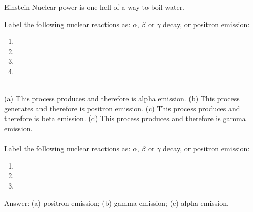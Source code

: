 \documentclass[main.tex]{subfiles}
\begin{document}
\begin{description}
\begin{marginfigure}%
    \begin{shadequote}[l]{Einstein}
Nuclear power is one hell of a way to boil water.
\end{shadequote}   \end{marginfigure}%

\begin{example} %
Label the following nuclear reactions as: $\alpha$, $\beta$ or $\gamma$ decay, or positron emission:
\begin{multicols}{2}
\begin{enumerate}[label=(\alph*)]
\item {}
\item {}
\item {}
\item {}
\end{enumerate}
\end{multicols}
\\
(a) This process produces  and therefore is alpha emission. (b) This process generates  and therefore is positron emission. (c) This process produces  and therefore is beta emission. (d) This process produces  and therefore is gamma emission.  \\
\faDiamond\ \\
Label the following nuclear reactions as: $\alpha$, $\beta$ or $\gamma$ decay, or positron emission:
\begin{multicols}{2}
\begin{enumerate}[label=(\alph*)]
\item {}
\item {}
\item {}
\end{enumerate}\end{multicols}
\flushright Answer: (a) positron emission; (b) gamma emission; (c) alpha emission.
\end{example}%
\end{description}
\end{document}
